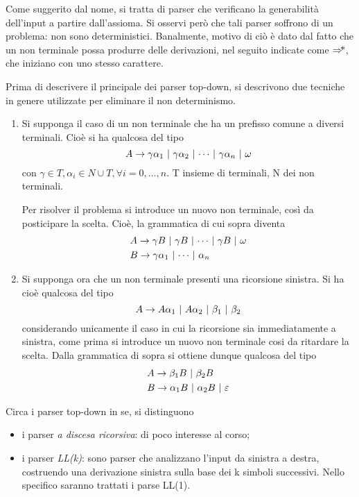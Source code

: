 \documentclass{subfiles}
\begin{document}
Come suggerito dal nome, si tratta di parser che verificano la generabilità dell'input a partire dall'assioma.
Si osservi però che tali parser soffrono di un problema: non sono deterministici.
Banalmente, motivo di ciò è dato dal fatto che un non terminale possa produrre delle derivazioni, nel seguito indicate come $\operatorname{\Rightarrow\hspace{-5pt}*}$,
che iniziano con uno stesso carattere.

Prima di descrivere il principale dei parser top-down, si descrivono due tecniche in genere utilizzate per eliminare il non determinismo.
\begin{enumerate}
    \item Si supponga il caso di un non terminale che ha un prefisso comune a diversi terminali.
          Cioè si ha qualcosa del tipo
          $$
              \Grammar{A}{\gamma \alpha_{1}}[\gamma \alpha_{2}, \cdots, \gamma \alpha_{n}, \omega]
          $$
          con $\gamma \in T, \alpha_{i} \in N \cup T, \forall i = 0, \ldots, n$. T insieme di terminali, N dei non terminali.

          Per risolver il problema si introduce un nuovo non terminale, così da posticipare la scelta.
          Cioè, la grammatica di cui sopra diventa
          $$\begin{aligned}
                   & \Grammar{A}{\gamma B}[\gamma B, \cdots, \gamma B, \omega] \\
                   & \Grammar{B}{\gamma \alpha_{1}}[\cdots, \alpha_{n}]        \\
              \end{aligned}$$
    \item Si supponga ora che un non terminale presenti una ricorsione sinistra.
          Si ha cioè qualcosa del tipo
          $$
              \Grammar{A}{A \alpha_{1}}[A \alpha_{2}, \beta_{1}, \beta_{2}]
          $$
          considerando unicamente il caso in cui la ricorsione sia immediatamente a sinistra,
          come prima si introduce un nuovo non terminale cosi da ritardare la scelta.
          Dalla grammatica di sopra si ottiene dunque qualcosa del tipo
          $$\begin{aligned}
                   & \Grammar{A}{\beta_{1} B}[\beta_{2} B]                \\
                   & \Grammar{B}{\alpha_{1} B}[\alpha_{2} B, \varepsilon] \\
              \end{aligned}$$
\end{enumerate}
Circa i parser top-down in se, si distinguono
\begin{itemize}
    \item i parser \emph{a discesa ricorsiva}: di poco interesse al corso;
    \item i parser \emph{LL(k)}: sono parser che analizzano l'input da sinistra a destra,
          costruendo una derivazione sinistra sulla base dei k simboli successivi.
          Nello specifico saranno trattati i parse LL(1).
\end{itemize}
\end{document}
